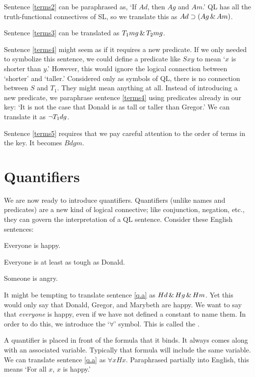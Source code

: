 Sentence \ref{terms2} can be paraphrased as, `If $Ad$, then $Ag$ and $Am$.' QL has all the truth-functional connectives of SL, so we translate this as $Ad \supset (Ag \,\&\, Am)$.

Sentence \ref{terms3} can be translated as $T_1mg \,\&\, T_2mg$.

Sentence \ref{terms4} might seem as if it requires a new predicate. If we only needed to symbolize this sentence, we could define a predicate like $Sxy$ to mean `$x$ is shorter than $y$.' However, this would ignore the logical connection between `shorter' and `taller.' Considered only as symbols of QL, there is no connection between $S$ and $T_1$. They might mean anything at all. Instead of introducing a new predicate, we paraphrase sentence \ref{terms4} using predicates already in our key: `It is not the case that Donald is as tall or taller than Gregor.' We can translate it as $\neg T_1dg$.

Sentence \ref{terms5} requires that we pay careful attention to the order of terms in the key. It becomes $Bdgm$.






\section{Quantifiers}
We are now ready to introduce quantifiers. Quantifiers (unlike names and predicates) are a new kind of logical connective; like conjunction, negation, etc., they can govern the interpretation of a QL sentence.  Consider these English sentences:
\begin{earg}
\item[\ex{q.a}] Everyone is happy.
\item[\ex{q.ac}] Everyone is at least as tough as Donald.
\item[\ex{q.e}] Someone is angry.
\end{earg}

It might be tempting to translate sentence \ref{q.a} as $Hd \,\&\, Hg \,\&\, Hm$. Yet this would only say that Donald, Gregor, and Marybeth are happy. We want to say that \emph{everyone} is happy, even if we have not defined a constant to name them. In order to do this, we introduce the `$\forall$' symbol. This is called the .

A quantifier is placed in front of the formula that it binds. It always comes along with an associated variable. Typically that formula will include the same variable. We can translate sentence \ref{q.a} as $\forall x Hx$. Paraphrased partially into English, this means `For all $x$, $x$ is happy.'

